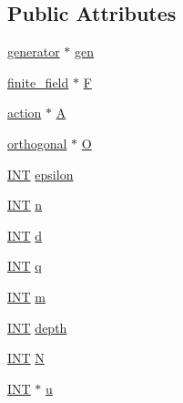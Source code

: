 \subsection*{Public Attributes}
\begin{DoxyCompactItemize}
\item 
\mbox{\hyperlink{classgenerator}{generator}} $\ast$ \mbox{\hyperlink{classovoid__generator_ae46fae0fb0ad0e4162eb9529ef217d1b}{gen}}
\item 
\mbox{\hyperlink{classfinite__field}{finite\+\_\+field}} $\ast$ \mbox{\hyperlink{classovoid__generator_a2549f47cd3d904516440ab84ca30a1af}{F}}
\item 
\mbox{\hyperlink{classaction}{action}} $\ast$ \mbox{\hyperlink{classovoid__generator_afb0f1277d15676523710fd8349640469}{A}}
\item 
\mbox{\hyperlink{classorthogonal}{orthogonal}} $\ast$ \mbox{\hyperlink{classovoid__generator_a62a6c12a5a07bf3554bef7b0b0fe28ab}{O}}
\item 
\mbox{\hyperlink{galois_8h_a09fddde158a3a20bd2dcadb609de11dc}{I\+NT}} \mbox{\hyperlink{classovoid__generator_ab2b4147cf0e28b495a3d981b71da75b1}{epsilon}}
\item 
\mbox{\hyperlink{galois_8h_a09fddde158a3a20bd2dcadb609de11dc}{I\+NT}} \mbox{\hyperlink{classovoid__generator_aef2e02313ef08586f7c27117b7d116e7}{n}}
\item 
\mbox{\hyperlink{galois_8h_a09fddde158a3a20bd2dcadb609de11dc}{I\+NT}} \mbox{\hyperlink{classovoid__generator_a5f6aeac2598b96009dac826dffb9944b}{d}}
\item 
\mbox{\hyperlink{galois_8h_a09fddde158a3a20bd2dcadb609de11dc}{I\+NT}} \mbox{\hyperlink{classovoid__generator_a234ea6e3f5c5f522ff87768bfd3bdbd5}{q}}
\item 
\mbox{\hyperlink{galois_8h_a09fddde158a3a20bd2dcadb609de11dc}{I\+NT}} \mbox{\hyperlink{classovoid__generator_a7567273c440d9ea76657b32f5e4036e7}{m}}
\item 
\mbox{\hyperlink{galois_8h_a09fddde158a3a20bd2dcadb609de11dc}{I\+NT}} \mbox{\hyperlink{classovoid__generator_aff5ba2a469448588704a1eda5cdd20e4}{depth}}
\item 
\mbox{\hyperlink{galois_8h_a09fddde158a3a20bd2dcadb609de11dc}{I\+NT}} \mbox{\hyperlink{classovoid__generator_a0d5a0b8510a585407f8579845934ded9}{N}}
\item 
\mbox{\hyperlink{galois_8h_a09fddde158a3a20bd2dcadb609de11dc}{I\+NT}} $\ast$ \mbox{\hyperlink{classovoid__generator_aff25630d1357ebc734201c3964d0277d}{u}}
\item 

\end{DoxyCompactItemize}
